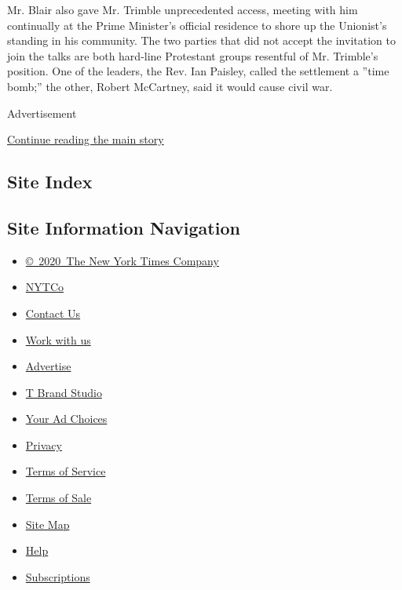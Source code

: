 Mr. Blair also gave Mr. Trimble unprecedented access, meeting with him
continually at the Prime Minister's official residence to shore up the
Unionist's standing in his community. The two parties that did not
accept the invitation to join the talks are both hard-line Protestant
groups resentful of Mr. Trimble's position. One of the leaders, the Rev.
Ian Paisley, called the settlement a ''time bomb;'' the other, Robert
McCartney, said it would cause civil war.

Advertisement

\protect\hyperlink{after-bottom}{Continue reading the main story}

\hypertarget{site-index}{%
\subsection{Site Index}\label{site-index}}

\hypertarget{site-information-navigation}{%
\subsection{Site Information
Navigation}\label{site-information-navigation}}

\begin{itemize}
\tightlist
\item
  \href{https://help.nytimes.com/hc/en-us/articles/115014792127-Copyright-notice}{©~2020~The
  New York Times Company}
\end{itemize}

\begin{itemize}
\tightlist
\item
  \href{https://www.nytco.com/}{NYTCo}
\item
  \href{https://help.nytimes.com/hc/en-us/articles/115015385887-Contact-Us}{Contact
  Us}
\item
  \href{https://www.nytco.com/careers/}{Work with us}
\item
  \href{https://nytmediakit.com/}{Advertise}
\item
  \href{http://www.tbrandstudio.com/}{T Brand Studio}
\item
  \href{https://www.nytimes.com/privacy/cookie-policy\#how-do-i-manage-trackers}{Your
  Ad Choices}
\item
  \href{https://www.nytimes.com/privacy}{Privacy}
\item
  \href{https://help.nytimes.com/hc/en-us/articles/115014893428-Terms-of-service}{Terms
  of Service}
\item
  \href{https://help.nytimes.com/hc/en-us/articles/115014893968-Terms-of-sale}{Terms
  of Sale}
\item
  \href{https://spiderbites.nytimes.com}{Site Map}
\item
  \href{https://help.nytimes.com/hc/en-us}{Help}
\item
  \href{https://www.nytimes.com/subscription?campaignId=37WXW}{Subscriptions}
\end{itemize}

